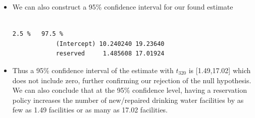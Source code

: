 \documentclass[12pt,letterpaper]{article}
\begin{document}
\begin{enumerate}
\begin{itemize}
		\item We can also construct a 95\% confidence interval for our found estimate
		
		\begin{verbatim}
																		2.5 %   97.5 %
			(Intercept) 10.240240 19.23640
			reserved     1.485608 17.01924
		\end{verbatim}
		\item 	Thus a 95\% confidence interval of the estimate with $t_{320}$ is [1.49,17.02] which does not include zero, further confirming our rejection of the null hypothesis. We can also conclude that at the 95\% confidence level, having a reservation policy increases the number of new/repaired drinking water facilities by as few as 1.49 facilities or as many as 17.02 facilities. 
		 
	\end{itemize}

\end{enumerate}
\end{document}
